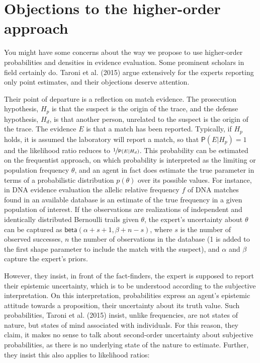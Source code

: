 \documentclass[
  10pt,
  dvipsnames,enabledeprecatedfontcommands]{scrartcl}
\newcommand{\pr}[1]{\mathsf{P}(#1)}
\newcommand{\s}[1]{\mbox{$\mathsf{#1}$}}
\begin{document}
\pagebreak

\hypertarget{objections-to-the-higher-order-approach}{%
\section{Objections to the higher-order
approach}\label{objections-to-the-higher-order-approach}}

You might have some concerns about the way we propose to use
higher-order probabilities and densities in evidence evaluation. Some
prominent scholars in field certainly do. Taroni et al. (2015) argue
extensively for the experts reporting only point estimates, and their
objections deserve attention.

Their point of departure is a reflection on match evidence. The
prosecution hypothesis, \(H_p\) is that the suspect is the origin of the
trace, and the defense hypothesis, \(H_d\), is that another person,
unrelated to the suspect is the origin of the trace. The evidence \(E\)
is that a match has been reported. Typically, if \(H_p\) holds, it is
assumed the laboratory will report a match, so that
\(\pr{E\vert H_p}=1\) and the likelihood ratio reduces to
\(\nicefrac{1}{\pr{E \vert H_d}}\). This probability can be estimated on
the frequentist approach, on which probability is interpreted as the
limiting or population frequency \(\theta\), and an agent in fact does
estimate the true parameter in terms of a probabilistic distribution
\(p(\theta)\) over its possible values. For instance, in DNA evidence
evaluation the allelic relative frequency \(f\) of DNA matches found in
an available database is an estimate of the true frequency in a given
population of interest. If the observations are realizations of
independent and identically distributed Bernoulli trails given
\(\theta\), the expert's uncertainty about \(\theta\) can be captured as
\(\s{beta}(\alpha + s + 1 ,\beta + n - s)\), where \(s\) is the number
of observed successes, \(n\) the number of observations in the database
(1 is added to the first shape parameter to include the match with the
suspect), and \(\alpha\) and \(\beta\) capture the expert's priors.

However, they insist, in front of the fact-finders, the expert is
supposed to report their epistemic uncertainty, which is to be
understood according to the subjective interpretation. On this
interpretation, probabilities express an agent's epistemic attitude
towards a proposition, their uncertainty about its truth value. Such
probabilities, Taroni et al. (2015) insist, unlike frequencies, are not
states of nature, but states of mind associated with individuals. For
this reason, they claim, it makes no sense to talk about second-order
uncertainty about subjective probabilities, as there is no underlying
state of the nature to estimate. Further, they insist this also applies
to likelihood ratios:
\end{document}
